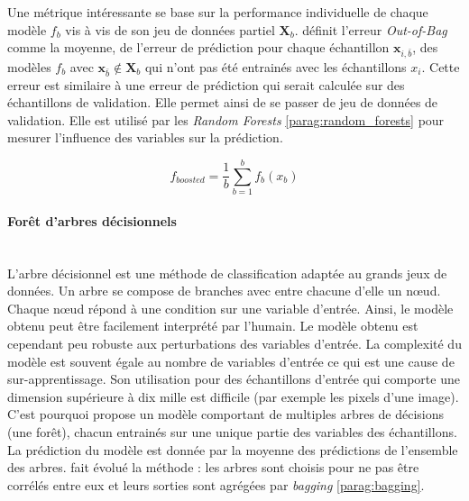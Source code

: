 Une métrique intéressante se base sur la performance individuelle de chaque modèle $f_b$ vis à vis de son jeu de données partiel $\mathbf{X}_b$.
\citeauthor{breiman_bagging_1996} \cite{breiman_bagging_1996} définit l'erreur \textit{Out-of-Bag} comme la moyenne, de l'erreur de prédiction pour chaque échantillon $\mathbf{x}_{i,\bar{b}}$, des modèles $f_b$ avec $ \mathbf{x}_{\bar{b}} \notin \mathbf{X}_b$ qui n'ont pas été entrainés avec les échantillons $x_i$.
Cette erreur est similaire à une erreur de prédiction qui serait calculée sur des échantillons de validation.
Elle permet ainsi de se passer de jeu de données de validation.
Elle est utilisé par les \textit{Random Forests} \ref{parag:random_forests} pour mesurer l'influence des variables sur la prédiction.

\begin{equation} \label{eq:bagging}
f_{boosted} = \frac{1}{b} \sum_{b=1}^{b} f_{b}\left(x_b\right)
\end{equation}

\paragraph{Forêt d'arbres décisionnels}\mbox{\label{parag:random_forests}} \\
L'arbre décisionnel est une méthode de classification adaptée au grands jeux de données.
Un arbre se compose de branches avec entre chacune d'elle un nœud.
Chaque nœud répond à une condition sur une variable d'entrée.
Ainsi, le modèle obtenu peut être facilement interprété par l'humain.
Le modèle obtenu est cependant peu robuste aux perturbations des variables d'entrée.
La complexité du modèle est souvent égale au nombre de variables d'entrée ce qui est une cause de sur-apprentissage.
Son utilisation pour des échantillons d'entrée qui comporte une dimension supérieure à dix mille est difficile (par exemple les pixels d'une image).
C'est pourquoi \citeauthor{ho_random_1995}
\cite{ho_random_1995, ho_random_1998} propose un modèle comportant de multiples arbres de décisions (une forêt), chacun entrainés sur une unique partie des variables des échantillons.
La prédiction du modèle est donnée par la moyenne des prédictions de l'ensemble des arbres. 
\citeauthor{breiman_random_2001} \cite{breiman_random_2001} fait évolué la méthode : les arbres sont choisis pour ne pas être corrélés entre eux et leurs sorties sont agrégées par \textit{bagging} \ref{parag:bagging}.

